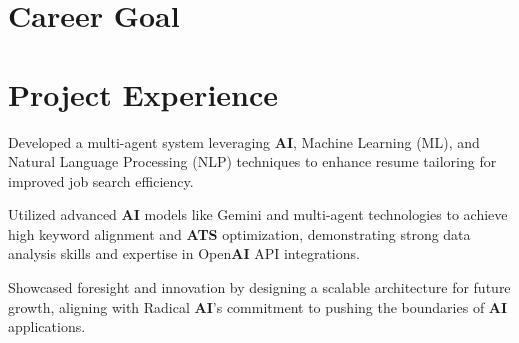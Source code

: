 \begin{minipage}[t]{0.63\textwidth}
    \section{Career Goal} 
      \betweensummaryPointsionVSpace
    \sectionsep

  \section{Project Experience}
    
    \vspace{15pt} %
    
    \begin{tightemize}
      \item Developed a multi-agent system leveraging \textbf{AI}, Machine Learning (ML), and Natural Language Processing (NLP) techniques to enhance resume tailoring for improved job search efficiency.
      \item Utilized advanced \textbf{AI} models like Gemini and multi-agent technologies to achieve high keyword alignment and \textbf{ATS} optimization, demonstrating strong data analysis skills and expertise in Open\textbf{AI} API integrations.
      \item Showcased foresight and innovation by designing a scalable architecture for future growth, aligning with Radical \textbf{AI}'s commitment to pushing the boundaries of \textbf{AI} applications.
    \end{tightemize}
  \sectionsep


\end{minipage}
